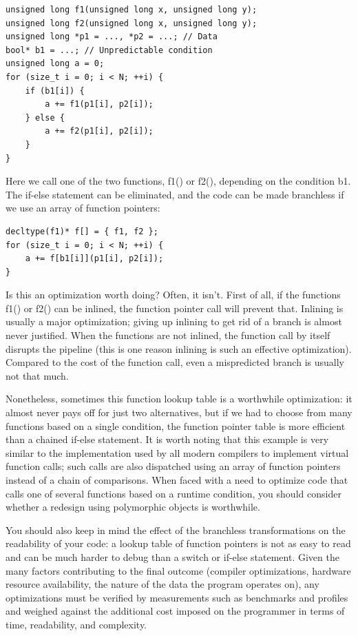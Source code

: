 \begin{lstlisting}[style=styleCXX]
unsigned long f1(unsigned long x, unsigned long y);
unsigned long f2(unsigned long x, unsigned long y);
unsigned long *p1 = ..., *p2 = ...; // Data
bool* b1 = ...; // Unpredictable condition
unsigned long a = 0;
for (size_t i = 0; i < N; ++i) {
	if (b1[i]) {
		a += f1(p1[i], p2[i]);
	} else {
		a += f2(p1[i], p2[i]);
	}
}
\end{lstlisting}

Here we call one of the two functions, f1() or f2(), depending on the condition b1. The if-else statement can be eliminated, and the code can be made branchless if we use an array of function pointers:

\begin{lstlisting}[style=styleCXX]
decltype(f1)* f[] = { f1, f2 };
for (size_t i = 0; i < N; ++i) {
	a += f[b1[i]](p1[i], p2[i]);
}
\end{lstlisting}

Is this an optimization worth doing? Often, it isn't. First of all, if the functions f1() or f2() can be inlined, the function pointer call will prevent that. Inlining is usually a major optimization; giving up inlining to get rid of a branch is almost never justified. When the functions are not inlined, the function call by itself disrupts the pipeline (this is one reason inlining is such an effective optimization). Compared to the cost of the function call, even a mispredicted branch is usually not that much.

Nonetheless, sometimes this function lookup table is a worthwhile optimization: it almost never pays off for just two alternatives, but if we had to choose from many functions based on a single condition, the function pointer table is more efficient than a chained if-else statement. It is worth noting that this example is very similar to the implementation used by all modern compilers to implement virtual function calls; such calls are also dispatched using an array of function pointers instead of a chain of comparisons. When faced with a need to optimize code that calls one of several functions based on a runtime condition, you should consider whether a redesign using polymorphic objects is worthwhile.

You should also keep in mind the effect of the branchless transformations on the readability of your code: a lookup table of function pointers is not as easy to read and can be much harder to debug than a switch or if-else statement. Given the many factors contributing to the final outcome (compiler optimizations, hardware resource availability, the nature of the data the program operates on), any optimizations must be verified by measurements such as benchmarks and profiles and weighed against the additional cost imposed on the programmer in terms of time, readability, and complexity.








